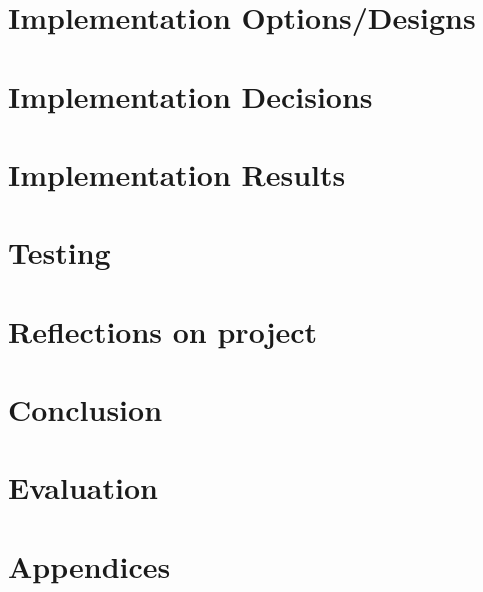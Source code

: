\documentclass[12pt]{article}
\begin{document}
\section{Implementation Options/Designs}

\newpage

\section{Implementation Decisions}

\newpage


\section{Implementation Results}

\newpage

\section{Testing}

\newpage


\section{Reflections on project}



\section{Conclusion}

\newpage

\section{Evaluation}

\newpage



\section{Appendices}


\newpage
\end{document}
